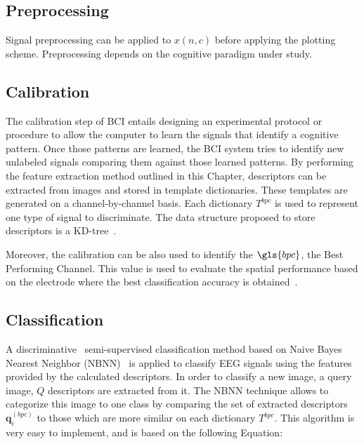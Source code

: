 \subsection{Preprocessing}

Signal preprocessing can be applied to $x(n,c)$ before applying the plotting scheme.  Preprocessing depends on the cognitive paradigm under study.  

%

\subsection{Calibration}
\label{Calibration}

The calibration step of BCI entails designing an experimental protocol or procedure to allow the computer to learn the signals that identify a cognitive pattern.  Once those patterns are learned, the BCI system tries to identify new unlabeled signals comparing them against those learned patterns.  By performing the feature extraction method outlined in this Chapter, descriptors can be extracted from images and stored in template dictionaries.  These templates are generated on a channel-by-channel basis.  Each dictionary $T^{bpc}$ is used to represent one type of signal to discriminate. The data structure proposed to store descriptors is a KD-tree~\cite{Lowe2004}.

Moreover, the calibration can be also used to identify the $\gls{bpc}$, the Best Performing Channel. This value is used to evaluate the spatial performance based on the electrode where the best classification accuracy is obtained~\cite{Chavarriaga2017}.

\subsection{Classification}
\label{nbnn}

A discriminative~\cite{WolpawJonathanR2012} semi-supervised classification method based on Naive Bayes Nearest Neighbor (NBNN)~\cite{Boiman2008} is applied to classify EEG signals using the features provided by the calculated descriptors. In order to classify a new image, a query image, $Q$ descriptors are extracted from it.  The NBNN technique allows to categorize this image to one class by comparing the set of extracted descriptors $\mathbf{q}_{i}^{(bpc)}$ to those which are more similar on each dictionary $T^{bpc}$.  This algorithm is very easy to implement, and is based on the following Equation:

